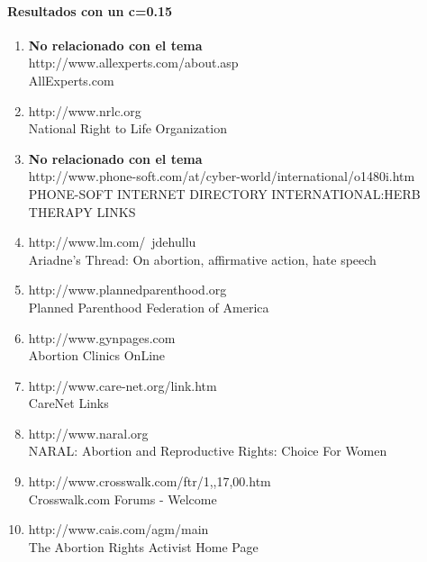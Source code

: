 \paragraph{Resultados con un c=0.15}
\begin{enumerate}
\item
 \textbf{No relacionado con el tema}\\
http://www.allexperts.com/about.asp\\
AllExperts.com
\item
http://www.nrlc.org\\
National Right to Life Organization
\item
\textbf{No relacionado con el tema}\\
http://www.phone-soft.com/at/cyber-world/international/o1480i.htm\\
PHONE-SOFT INTERNET DIRECTORY INTERNATIONAL:HERB THERAPY LINKS
\item

http://www.lm.com/~jdehullu\\
Ariadne's Thread: On abortion, affirmative action, hate speech
\item


http://www.plannedparenthood.org\\
Planned Parenthood Federation of America
\item

http://www.gynpages.com\\
Abortion Clinics OnLine
\item

http://www.care-net.org/link.htm\\
CareNet Links
\item

http://www.naral.org\\
NARAL: Abortion and Reproductive Rights: Choice For Women
 \item

http://www.crosswalk.com/ftr/1,,17,00.htm \\
Crosswalk.com Forums - Welcome
 \item

http://www.cais.com/agm/main\\
The Abortion Rights Activist Home Page

\end{enumerate}

